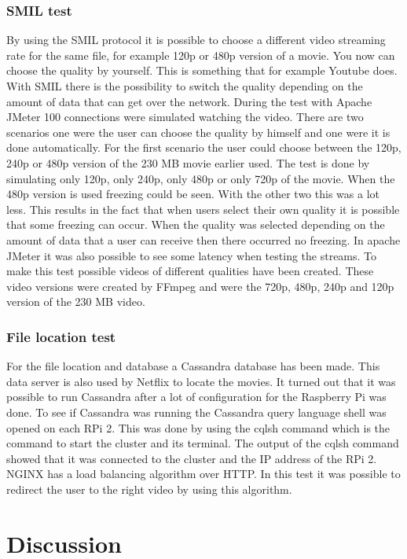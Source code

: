 \documentclass{sig-alternate-br}
\begin{document}
\subsubsection{SMIL test}
By using the SMIL protocol it is possible to choose a different video streaming rate for the same file, for example 120p or 480p version of a movie. You now can choose the quality by yourself. This is something that for example Youtube does. With SMIL there is the possibility to switch the quality depending on the amount of data that can get over the network. During the test with Apache JMeter 100 connections were simulated watching the video. There are two scenarios one were the user can choose the quality by himself and one were it is done automatically. For the first scenario the user could choose between the 120p, 240p or 480p version of the 230 MB movie earlier used. The test is done by simulating only 120p, only 240p, only 480p or only 720p of the movie. When the 480p version is used freezing could be seen. With the other two this was a lot less. This results in the fact that when users select their own quality it is possible that some freezing can occur. When the quality was selected depending on the amount of data that a user can receive then there occurred no freezing. In apache JMeter it was also possible to see some latency when testing the streams. To make this test possible videos of different qualities have been created. These video versions were created by FFmpeg and were the 720p, 480p, 240p and 120p version of the 230 MB video. 

\subsubsection{File location test}
For the file location and database a Cassandra database has been made. This data server is also used by Netflix to locate the movies. It turned out that it was possible to run Cassandra after a lot of configuration for the Raspberry Pi was done. To see if Cassandra was running the Cassandra query language shell was  opened on each RPi 2. This was done by using the cqlsh command which is the command to start the cluster and its terminal. The output of the cqlsh command showed that it was connected to the cluster and the IP address of the RPi 2. \newline
NGINX has a load balancing algorithm over HTTP. In this test it was possible to redirect the user to the right video by using this algorithm. 

\section{Discussion}
\end{document}
